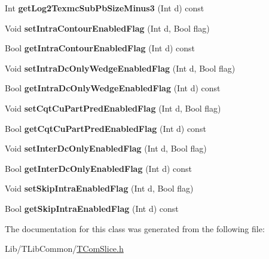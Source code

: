 \begin{DoxyCompactItemize}
Int {\bfseries get\+Log2\+Texmc\+Sub\+Pb\+Size\+Minus3} (Int d) const
\item 
\mbox{\label{class_t_com_sps3d_extension_aaeb02dcd1948e96cfa13f5646861252d}} 
Void {\bfseries set\+Intra\+Contour\+Enabled\+Flag} (Int d, Bool flag)
\item 
\mbox{\label{class_t_com_sps3d_extension_a20f1e8a5ee2f573bc3aaac66e9000aa9}} 
Bool {\bfseries get\+Intra\+Contour\+Enabled\+Flag} (Int d) const
\item 
\mbox{\label{class_t_com_sps3d_extension_acc7bf0d2177835e8acc5616111e718d9}} 
Void {\bfseries set\+Intra\+Dc\+Only\+Wedge\+Enabled\+Flag} (Int d, Bool flag)
\item 
\mbox{\label{class_t_com_sps3d_extension_a27b7d3fb1cbda62a9c3db40788c54882}} 
Bool {\bfseries get\+Intra\+Dc\+Only\+Wedge\+Enabled\+Flag} (Int d) const
\item 
\mbox{\label{class_t_com_sps3d_extension_ac2fe73da7fcce6fea0f5008eb2d5e09b}} 
Void {\bfseries set\+Cqt\+Cu\+Part\+Pred\+Enabled\+Flag} (Int d, Bool flag)
\item 
\mbox{\label{class_t_com_sps3d_extension_a1e6c581f04828fc78b6bf025035d0508}} 
Bool {\bfseries get\+Cqt\+Cu\+Part\+Pred\+Enabled\+Flag} (Int d) const
\item 
\mbox{\label{class_t_com_sps3d_extension_a9ffd98d94be241ae86a1cbf95924371f}} 
Void {\bfseries set\+Inter\+Dc\+Only\+Enabled\+Flag} (Int d, Bool flag)
\item 
\mbox{\label{class_t_com_sps3d_extension_a6c62ff2cf8b714a725030e2c10022360}} 
Bool {\bfseries get\+Inter\+Dc\+Only\+Enabled\+Flag} (Int d) const
\item 
\mbox{\label{class_t_com_sps3d_extension_afff558570fca28315cd128a6c2c05365}} 
Void {\bfseries set\+Skip\+Intra\+Enabled\+Flag} (Int d, Bool flag)
\item 
\mbox{\label{class_t_com_sps3d_extension_a7cedaa739b7a20a99c556eab01d58203}} 
Bool {\bfseries get\+Skip\+Intra\+Enabled\+Flag} (Int d) const
\end{DoxyCompactItemize}


The documentation for this class was generated from the following file\+:\begin{DoxyCompactItemize}
\item 
Lib/\+T\+Lib\+Common/\hyperlink{_t_com_slice_8h}{T\+Com\+Slice.\+h}\end{DoxyCompactItemize}
